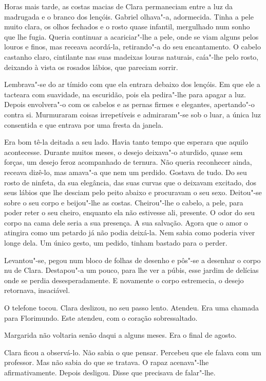 Horas mais tarde, as costas macias de Clara permaneciam entre a luz da
madrugada e o branco dos lençóis. Gabriel olhava"-a, adormecida. Tinha a
pele muito clara, os olhos fechados e o rosto quase infantil, mergulhado
num sonho que lhe fugia. Queria continuar a acariciar"-lhe a pele, onde
se viam alguns pelos louros e finos, mas receava acordá-la, retirando"-a
do seu encantamento. O cabelo castanho claro, cintilante nas suas
madeixas louras naturais, caía"-lhe pelo rosto, deixando à vista os
rosados lábios, que pareciam sorrir.

Lembrava"-se do ar tímido com que ela entrara debaixo dos lençóis. Em que
ele a tacteara com suavidade, na escuridão, pois ela pedira"-lhe para
apagar a luz. Depois envolvera"-o com os cabelos e as pernas firmes e
elegantes, apertando"-o contra si. Murmuraram coisas irrepetíveis e
admiraram"-se sob o luar, a única luz consentida e que entrava por uma
fresta da janela.

Era bom tê-la deitada a seu lado. Havia tanto tempo que esperara que
aquilo acontecesse. Durante muitos meses, o desejo deixava"-o aturdido,
quase sem forças, um desejo feroz acompanhado de ternura. Não queria
reconhecer ainda, receava dizê-lo, mas amava"-a que nem um perdido.
Gostava de tudo. Do seu rosto de ninfeta, da sua elegância, das suas
curvas que o deixavam excitado, dos seus lábios que lhe desciam pelo
peito abaixo e procuravam o seu sexo. Deitou"-se sobre o seu corpo e
beijou"-lhe as costas. Cheirou"-lhe o cabelo, a pele, para poder reter o
seu cheiro, enquanto ela não estivesse ali, presente. O odor do seu
corpo na cama dele seria a sua presença. A sua salvação. Agora que o
amor o atingira como um petardo já não podia deixá-la. Nem sabia como
poderia viver longe dela. Um único gesto, um pedido, tinham bastado para
o perder.

Levantou"-se, pegou num bloco de folhas de desenho e pôs"-se a desenhar o
corpo nu de Clara. Destapou"-a um pouco, para lhe ver a púbis, esse
jardim de delícias onde se perdia desesperadamente. E novamente o corpo
estremecia, o desejo retornava, insaciável.

O telefone tocou. Clara deslizou, no seu passo lento. Atendeu. Era uma
chamada para Florimundo. Este atendeu, com o coração sobressaltado.

Margarida não voltaria senão daqui a alguns meses. Era o final de
agosto.

Clara ficou a observá-lo. Não sabia o que pensar. Percebeu que ele
falava com um professor. Mas não sabia do que se tratava. O rapaz
acenava"-lhe afirmativamente. Depois desligou. Disse que precisava de
falar"-lhe.


